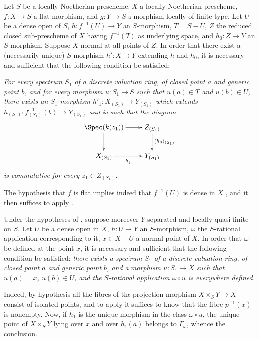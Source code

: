 \begin{corollary}[20.4.9]
\label{IV.20.4.9}
Let $S$ be a locally Noetherian prescheme, $X$ a locally Noetherian prescheme, $f:X\to S$ a flat morphism, and $g:Y\to S$ a morphism locally of finite type.
Let $U$ be a dense open of $S$, $h:f^{-1}(U)\to Y$ an $S$-morphism, $T=S-U$, $Z$ the reduced closed sub-prescheme of $X$ having $f^{-1}(T)$ as underlying space, and $h_0:Z\to Y$ an $S$-morphism.
Suppose $X$ normal at all points of $Z$.
In order that there exist a (necessarily unique) $S$-morphism $h':X\to Y$ extending $h$ and $h_0$, it is necessary and sufficient that the following condition be satisfied:

\emph{For every spectrum $S_1$ of a discrete valuation ring, of closed point $a$ and generic point $b$, and for every morphism $u:S_1\to S$ such that $u(a)\in T$ and $u(b)\in U$, there exists an $S_1$-morphism $h'_1:X_{(S_1)}\to Y_{(S_1)}$ which extends $h_{(S_1)}:f_{(S_1)}^{-1}(b)\to Y_{(S_1)}$ and is such that the diagram}
\[
  \xymatrix{
  \Spec(k(z_1)) \ar[r] \ar[d] & Z_{(S_1)} \ar[d]^{(h_0)_{(S_1)}} \\
  X_{(S_1)} \ar[r]_{h'_1} & Y_{(S_1)}
  }
\]
\emph{is commutative for every $z_1\in Z_{(S_1)}$.}

The hypothesis that $f$ is flat implies indeed that $f^{-1}(U)$ is dense in $X$ , and it then suffices to apply .
\end{corollary}

\begin{corollary}[20.4.10]
\label{IV.20.4.10}
Under the hypotheses of , suppose moreover $Y$ separated and locally quasi-finite on $S$.
Let $U$ be a dense open in $X$, $h:U\to Y$ an $S$-morphism, $\omega$ the $S$-rational application corresponding to it, $x\in X-U$ a normal point of $X$.
In order that $\omega$ be defined at the point $x$, it is necessary and sufficient that the following condition be satisfied:
\emph{there exists a spectrum $S_1$ of a discrete valuation ring, of closed point $a$ and generic point $b$, and a morphism $u:S_1\to X$}
\emph{such that $u(a)=x$, $u(b)\in U$, and the $S$-rational application $\omega\circ u$ is everywhere defined.}

Indeed, by hypothesis all the fibres of the projection morphism $X\times_S Y\to X$ consist of isolated points, and to apply  it suffices to know that the fibre $p^{-1}(x)$ is nonempty.
Now, if $h_1$ is the unique morphism in the class $\omega\circ u$, the unique point of $X\times_S Y$ lying over $x$ and over $h_1(a)$ belongs to $\Gamma_\omega$, whence the conclusion.
\end{corollary}

